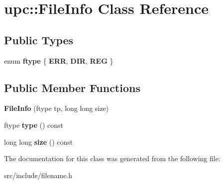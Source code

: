 \hypertarget{classupc_1_1FileInfo}{}\section{upc\+:\+:File\+Info Class Reference}
\label{classupc_1_1FileInfo}
\subsection*{Public Types}
\begin{DoxyCompactItemize}
\item 
\mbox{\label{classupc_1_1FileInfo_a0d92d84fa1bd96c5e623e696ef484f38}} 
enum {\bfseries ftype} \{ {\bfseries E\+RR}, 
{\bfseries D\+IR}, 
{\bfseries R\+EG}
 \}
\end{DoxyCompactItemize}
\subsection*{Public Member Functions}
\begin{DoxyCompactItemize}
\item 
\mbox{\label{classupc_1_1FileInfo_aa6b799f8194d7426f79b79ec88458e77}} 
{\bfseries File\+Info} (ftype tp, long long size)
\item 
\mbox{\label{classupc_1_1FileInfo_aa085db044f037f7a4597c5ce10bdfdb9}} 
ftype {\bfseries type} () const
\item 
\mbox{\label{classupc_1_1FileInfo_a3e745348db6d5e95886301aa0e019700}} 
long long {\bfseries size} () const
\end{DoxyCompactItemize}


The documentation for this class was generated from the following file\+:\begin{DoxyCompactItemize}
\item 
src/include/filename.\+h\end{DoxyCompactItemize}
